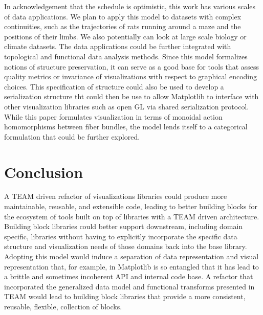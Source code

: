 \documentclass[../main.tex]{subfiles}
\begin{document}
In acknowledgement that the schedule is optimistic, this work has various scales of data applications. We plan to apply this model to datasets with complex continuities, such as the trajectories of rats running around a maze and the positions of their limbs. We also potentially can look at large scale biology or climate datasets. The data applications could be further integrated with topological\cite{heineSurveyTopologybasedMethods2016} and functional \cite{ramsayFunctionalDataAnalysis2006a} data analysis methods. Since this model formalizes notions of structure preservation, it can serve as a good base for tools that assess quality metrics\cite{bertiniQualityMetricsHighdimensional2011a} or invariance \cite{kindlmannAlgebraicProcessVisualization2014} of visualizations with respect to graphical encoding choices. This specification of structure could also be used to develop a serialization structure tht could then be use to allow Matplotlib to interface with other visualization libraries such as open GL via shared serialization protocol. While this paper formulates visualization in terms of monoidal action homomorphisms between fiber bundles, the model lends itself to a categorical formulation\cite{fongInvitationAppliedCategory2019,milewskiCategoryTheoryProgrammers} that could be further explored.  

\section{Conclusion}
A TEAM driven refactor of visualizations libraries could produce more maintainable, reusable, and extensible code, leading to better building blocks for the ecosystem of tools built on top of libraries with a TEAM driven architecture. Building block libraries could better support downstream, including domain specific, libraries without having to explicitly incorporate the specific data structure and visualization needs of those domains back into the base library. Adopting this model would induce a separation of data representation and visual representation that, for example, in Matplotlib is so entangled that it has lead to a brittle and sometimes incoherent API and internal code base. A refactor that incorporated the generalized data model and functional transforms presented in TEAM would lead to building block libraries that provide a more consistent, reusable, flexible, collection of blocks. 
\end{document}
